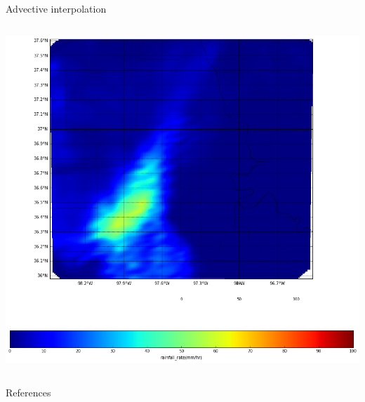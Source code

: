 \documentclass[final]{beamer}
\begin{document}
\begin{frame}{}
\begin{columns}[t]
\begin{column}{.3\linewidth}
\begin{block}{Advective interpolation}
\begin{columns}[t]
\begin{column}{.5\linewidth}
            		\includegraphics[width=1.0\linewidth]{figures/advective_accum.png}\\[1ex]  
 		\end{column}
	\end{columns}
      \end{block}
   
   
        \begin{block}{References}
        \small
       
        
         \end{block}


    \end{column}

  \end{columns}


  \vfill
\end{frame}
\end{document}
